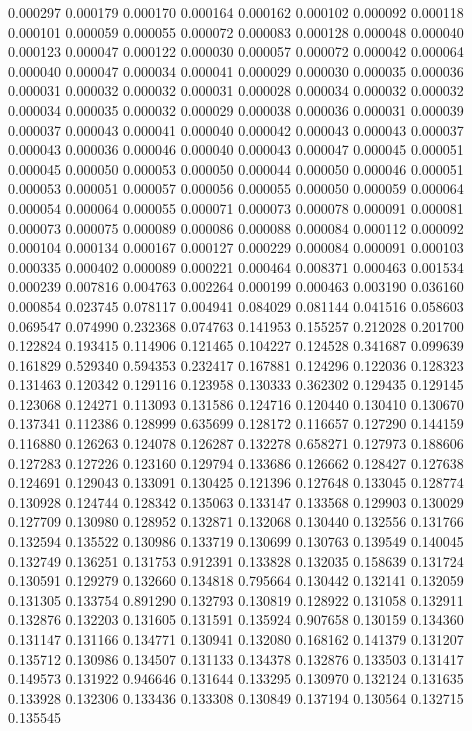 0.000297
0.000179
0.000170
0.000164
0.000162
0.000102
0.000092
0.000118
0.000101
0.000059
0.000055
0.000072
0.000083
0.000128
0.000048
0.000040
0.000123
0.000047
0.000122
0.000030
0.000057
0.000072
0.000042
0.000064
0.000040
0.000047
0.000034
0.000041
0.000029
0.000030
0.000035
0.000036
0.000031
0.000032
0.000032
0.000031
0.000028
0.000034
0.000032
0.000032
0.000034
0.000035
0.000032
0.000029
0.000038
0.000036
0.000031
0.000039
0.000037
0.000043
0.000041
0.000040
0.000042
0.000043
0.000043
0.000037
0.000043
0.000036
0.000046
0.000040
0.000043
0.000047
0.000045
0.000051
0.000045
0.000050
0.000053
0.000050
0.000044
0.000050
0.000046
0.000051
0.000053
0.000051
0.000057
0.000056
0.000055
0.000050
0.000059
0.000064
0.000054
0.000064
0.000055
0.000071
0.000073
0.000078
0.000091
0.000081
0.000073
0.000075
0.000089
0.000086
0.000088
0.000084
0.000112
0.000092
0.000104
0.000134
0.000167
0.000127
0.000229
0.000084
0.000091
0.000103
0.000335
0.000402
0.000089
0.000221
0.000464
0.008371
0.000463
0.001534
0.000239
0.007816
0.004763
0.002264
0.000199
0.000463
0.003190
0.036160
0.000854
0.023745
0.078117
0.004941
0.084029
0.081144
0.041516
0.058603
0.069547
0.074990
0.232368
0.074763
0.141953
0.155257
0.212028
0.201700
0.122824
0.193415
0.114906
0.121465
0.104227
0.124528
0.341687
0.099639
0.161829
0.529340
0.594353
0.232417
0.167881
0.124296
0.122036
0.128323
0.131463
0.120342
0.129116
0.123958
0.130333
0.362302
0.129435
0.129145
0.123068
0.124271
0.113093
0.131586
0.124716
0.120440
0.130410
0.130670
0.137341
0.112386
0.128999
0.635699
0.128172
0.116657
0.127290
0.144159
0.116880
0.126263
0.124078
0.126287
0.132278
0.658271
0.127973
0.188606
0.127283
0.127226
0.123160
0.129794
0.133686
0.126662
0.128427
0.127638
0.124691
0.129043
0.133091
0.130425
0.121396
0.127648
0.133045
0.128774
0.130928
0.124744
0.128342
0.135063
0.133147
0.133568
0.129903
0.130029
0.127709
0.130980
0.128952
0.132871
0.132068
0.130440
0.132556
0.131766
0.132594
0.135522
0.130986
0.133719
0.130699
0.130763
0.139549
0.140045
0.132749
0.136251
0.131753
0.912391
0.133828
0.132035
0.158639
0.131724
0.130591
0.129279
0.132660
0.134818
0.795664
0.130442
0.132141
0.132059
0.131305
0.133754
0.891290
0.132793
0.130819
0.128922
0.131058
0.132911
0.132876
0.132203
0.131605
0.131591
0.135924
0.907658
0.130159
0.134360
0.131147
0.131166
0.134771
0.130941
0.132080
0.168162
0.141379
0.131207
0.135712
0.130986
0.134507
0.131133
0.134378
0.132876
0.133503
0.131417
0.149573
0.131922
0.946646
0.131644
0.133295
0.130970
0.132124
0.131635
0.133928
0.132306
0.133436
0.133308
0.130849
0.137194
0.130564
0.132715
0.135545
